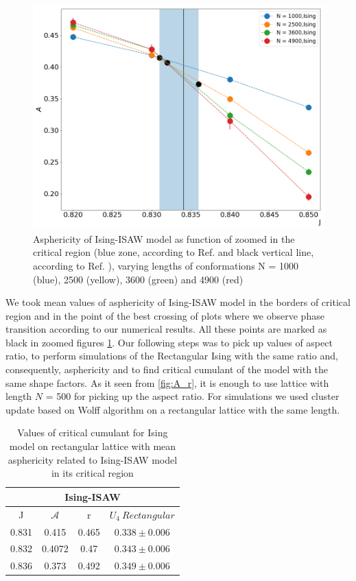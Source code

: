 \documentclass[aps,pre,amssymb,amsmath,twocolumn,floatfix]{revtex4-2}
\begin{document}
\begin{figure}[h!]
    \centering
    \includegraphics[width=\columnwidth]{Images/Ising_A_J_Close.png}
    \caption{Asphericity of Ising-ISAW model as function of zoomed in the critical region (blue zone, according to Ref. \cite{Foster2021} and black vertical line, according to Ref. \cite{faizullina2021critical}), varying lengths of conformations N = 1000 (blue), 2500 (yellow), 3600 (green) and 4900 (red)}
    \label{fig:Ising_A_J}
\end{figure}

We took mean values of asphericity of Ising-ISAW model in the borders of critical region and in the point of the best crossing of plots where we observe phase transition according to our numerical results. All these points are marked as black in zoomed figures \ref{fig:Ising_A_J}. Our following steps was to pick up values of aspect ratio, to perform simulations of the Rectangular Ising with the same ratio and, consequently, asphericity and to find critical cumulant of the model with the same shape factors. As it seen from \cref{fig:A_r}, it is enough to use lattice with length $N$ = 500 for picking up the aspect ratio. For simulations we used cluster update based on Wolff algorithm \cite{newmanb99} on a rectangular lattice with the same length.\\

\begin{table}[h]
    \centering
    \begin{tabular}{|c|c|c|c|}
        \hline
         \multicolumn{4}{|c|}{Ising-ISAW}  \\ \hline
         J & $\mathcal{A}$ & r & $U_{4}\  Rectangular$ \\ \hline
         0.831 & 0.415 & 0.465 & $0.338 \pm 0.006$\\ \hline
         0.832 & 0.4072 & 0.47 & $0.343 \pm 0.006$\\ \hline
         0.836 & 0.373 & 0.492 & $0.349 \pm 0.006$\\ \hline
         \end{tabular}
    \caption{Values of critical cumulant for Ising model on rectangular lattice with mean asphericity related to Ising-ISAW model in its critical region}
    \label{tab:A_r_U}
\end{table}
\end{document}
